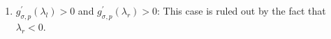 \documentclass[a4paper, 10pt]{article}
\theoremstyle{definition}
\begin{document}
\begin{itemize}
\begin{itemize}
\begin{enumerate}
            
            
    
            \item  $g^{'}_{\sigma,p}(\lambda_l)>0$ and $g^{'}_{\sigma,p}(\lambda_r)>0$: This case is ruled out by the fact that $\lambda_r<0$.

\end{enumerate}
\end{itemize}
\end{itemize}
\end{document}
